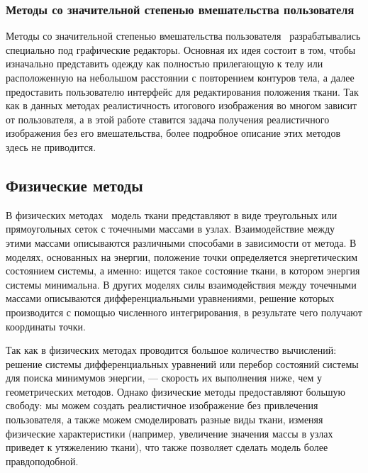 
\subsubsection{Методы со значительной степенью вмешательства пользователя}

Методы со значительной степенью вмешательства пользователя~\cite{bib09, bib10}
разрабатывались специально под графические редакторы. Основная их идея состоит в
том, чтобы изначально представить одежду как полностью прилегающую к телу или
расположенную на небольшом расстоянии с повторением контуров тела, а далее
предоставить пользователю интерфейс для редактирования положения ткани.  Так как
в данных методах реалистичность итогового изображения во многом зависит от
пользователя, а в этой работе ставится задача получения реалистичного
изображения без его вмешательства, более подробное описание этих методов здесь
не приводится.

\subsection{Физические методы}

В физических методах~\cite{bib07} модель ткани представляют в виде треугольных
или прямоугольных сеток с точечными массами в узлах. Взаимодействие между этими
массами  описываются различными способами в зависимости от метода. В моделях,
основанных на энергии, положение точки определяется энергетическим состоянием
системы, а именно: ищется такое состояние ткани, в котором энергия системы
минимальна. В других моделях силы взаимодействия между точечными массами
описываются дифференциальными уравнениями, решение которых производится с
помощью численного интегрирования, в результате чего получают координаты точки.

Так как в физических методах проводится большое количество вычислений: решение
системы дифференциальных уравнений или перебор состояний системы для поиска
минимумов энергии, --- скорость их выполнения ниже, чем у геометрических
методов. Однако физические методы предоставляют большую свободу: мы можем
создать реалистичное изображение без привлечения пользователя, а также можем
смоделировать разные виды ткани, изменяя физические характеристики (например,
увеличение значения массы в узлах приведет к утяжелению ткани), что также
позволяет сделать модель более правдоподобной.

